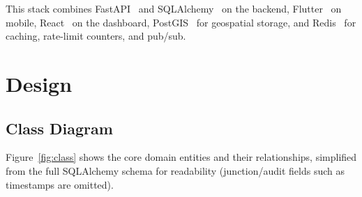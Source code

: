 This stack combines FastAPI~\cite{fastapi} and SQLAlchemy~\cite{sqlalchemy} on the backend, Flutter~\cite{flutter} on mobile, React~\cite{react} on the dashboard, PostGIS~\cite{postgis} for geospatial storage, and Redis~\cite{redis} for caching, rate-limit counters, and pub/sub.

\section{Design}

\subsection{Class Diagram}
\label{sec:class-diagram}

Figure~\ref{fig:class} shows the core domain entities and their relationships, simplified from the full SQLAlchemy schema for readability (junction/audit fields such as timestamps are omitted).

